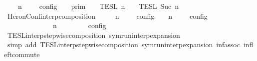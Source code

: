 \begin{isabellebody}
\ \ {\isacartoucheopen}{\isasymlbrakk}\ {\isasymGamma}{\isacharcomma}\ n\ {\isasymturnstile}\ {\isasymPsi}\ {\isasymtriangleright}\ {\isasymPhi}\ {\isasymrbrakk}\isactrlsub c\isactrlsub o\isactrlsub n\isactrlsub f\isactrlsub i\isactrlsub g\ {\isacharequal}\ {\isasymlbrakk}{\isasymlbrakk}\ {\isasymGamma}\ {\isasymrbrakk}{\isasymrbrakk}\isactrlsub p\isactrlsub r\isactrlsub i\isactrlsub m\ {\isasyminter}\ {\isasymlbrakk}{\isasymlbrakk}\ {\isasymPsi}\ {\isasymrbrakk}{\isasymrbrakk}\isactrlsub T\isactrlsub E\isactrlsub S\isactrlsub L\isactrlbsup {\isasymge}\ n\isactrlesup \ {\isasyminter}\ {\isasymlbrakk}{\isasymlbrakk}\ {\isasymPhi}\ {\isasymrbrakk}{\isasymrbrakk}\isactrlsub T\isactrlsub E\isactrlsub S\isactrlsub L\isactrlbsup {\isasymge}\ Suc\ n\isactrlesup {\isacartoucheclose}\isanewline
\isanewline
{}\isamarkupfalse%
\ HeronConf{\isacharunderscore}interp{\isacharunderscore}composition{\isacharcolon}\isanewline
\ \ \ {\isacartoucheopen}{\isasymlbrakk}\ {\isasymGamma}\ n\ {\isasymturnstile}\ {\isasymPsi}\ {\isasymtriangleright}\ {\isasymPhi}\ {\isasymrbrakk}\isactrlsub c\isactrlsub o\isactrlsub n\isactrlsub f\isactrlsub i\isactrlsub g\ {\isasyminter}\ {\isasymlbrakk}\ {\isasymGamma}\ n\ {\isasymturnstile}\ {\isasymPsi}\ {\isasymtriangleright}\ {\isasymPhi}\ {\isasymrbrakk}\isactrlsub c\isactrlsub o\isactrlsub n\isactrlsub f\isactrlsub i\isactrlsub g\isanewline
\ \ \ \ \ \ \ \ \ {\isacharequal}\ {\isasymlbrakk}\ {\isacharparenleft}{\isasymGamma}\ {\isacharat}\ {\isasymGamma}\ n\ {\isasymturnstile}\ {\isacharparenleft}{\isasymPsi}\ {\isacharat}\ {\isasymPsi}\ {\isasymtriangleright}\ {\isacharparenleft}{\isasymPhi}\ {\isacharat}\ {\isasymPhi}\ {\isasymrbrakk}\isactrlsub c\isactrlsub o\isactrlsub n\isactrlsub f\isactrlsub i\isactrlsub g{\isacartoucheclose}\isanewline
%
\isadelimproof
\ \ %
\endisadelimproof
%
\isatagproof
{}\isamarkupfalse%
\ TESL{\isacharunderscore}interp{\isacharunderscore}stepwise{\isacharunderscore}composition\ symrun{\isacharunderscore}interp{\isacharunderscore}expansion\isanewline
\ \ \isamarkupfalse%
\ {\isacharparenleft}simp\ add{\isacharcolon}\ TESL{\isacharunderscore}interp{\isacharunderscore}stepwise{\isacharunderscore}composition\ symrun{\isacharunderscore}interp{\isacharunderscore}expansion\ inf{\isacharunderscore}assoc\ inf{\isacharunderscore}left{\isacharunderscore}commute{\isacharparenright}%

\end{isabellebody}

